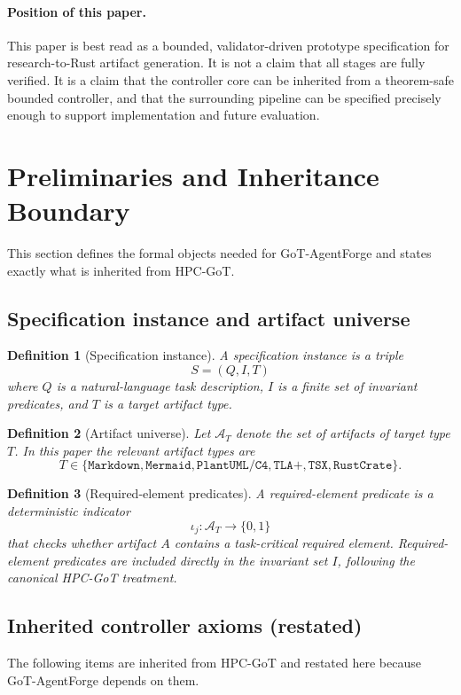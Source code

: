 \documentclass[11pt,a4paper,oneside]{article}
\newtheorem{definition}{Definition}[section]
\begin{document}
\paragraph{Position of this paper.}
This paper is best read as a bounded, validator-driven prototype specification for research-to-Rust artifact generation. It is not a claim that all stages are fully verified. It is a claim that the controller core can be inherited from a theorem-safe bounded controller, and that the surrounding pipeline can be specified precisely enough to support implementation and future evaluation.

\section{Preliminaries and Inheritance Boundary}
This section defines the formal objects needed for GoT-AgentForge and states exactly what is inherited from HPC-GoT.

\subsection{Specification instance and artifact universe}
\begin{definition}[Specification instance]
A specification instance is a triple
\[
S=(Q,I,T)
\]
where $Q$ is a natural-language task description, $I$ is a finite set of invariant predicates, and $T$ is a target artifact type.
\end{definition}

\begin{definition}[Artifact universe]
Let $\mathcal{A}_T$ denote the set of artifacts of target type $T$. In this paper the relevant artifact types are
\[
T \in \{\texttt{Markdown},\texttt{Mermaid},\texttt{PlantUML/C4},\texttt{TLA+},\texttt{TSX},\texttt{RustCrate}\}.
\]
\end{definition}

\begin{definition}[Required-element predicates]
A required-element predicate is a deterministic indicator
\[
\iota_j : \mathcal{A}_T \to \{0,1\}
\]
that checks whether artifact $A$ contains a task-critical required element. Required-element predicates are included directly in the invariant set $I$, following the canonical HPC-GoT treatment.
\end{definition}

\subsection{Inherited controller axioms (restated)}
The following items are inherited from HPC-GoT and restated here because GoT-AgentForge depends on them.
\end{document}
